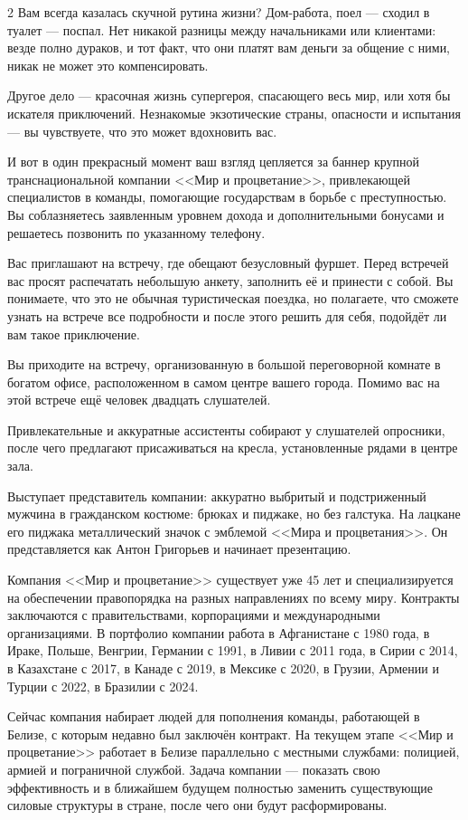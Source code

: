 \documentclass{article}
\begin{document}
\begin{multicols}{2}
Вам всегда казалась скучной рутина жизни? Дом-работа, поел --- сходил в туалет --- поспал. Нет никакой разницы между начальниками или клиентами: везде полно дураков, и тот факт, что они платят вам деньги за общение с ними, никак не может это компенсировать.

Другое дело --- красочная жизнь супергероя, спасающего весь мир, или хотя бы искателя приключений. Незнакомые экзотические страны, опасности и испытания --- вы чувствуете, что это может вдохновить вас.

И вот в один прекрасный момент ваш взгляд цепляется за баннер крупной транснациональной компании <<Мир и процветание>>, привлекающей специалистов в команды, помогающие государствам в борьбе с преступностью. Вы соблазняетесь заявленным уровнем дохода и дополнительными бонусами и решаетесь позвонить по указанному телефону.

Вас приглашают на встречу, где обещают безусловный фуршет. Перед встречей вас просят распечатать небольшую анкету, заполнить её и принести с собой. Вы понимаете, что это не обычная туристическая поездка, но полагаете, что сможете узнать на встрече все подробности и после этого решить для себя, подойдёт ли вам такое приключение.

Вы приходите на встречу, организованную в большой переговорной комнате в богатом офисе, расположенном в самом центре вашего города. Помимо вас на этой встрече ещё человек двадцать слушателей.

Привлекательные и аккуратные ассистенты собирают у слушателей опросники, после чего предлагают присаживаться на кресла, установленные рядами в центре зала.

Выступает представитель компании: аккуратно выбритый и подстриженный мужчина в гражданском костюме: брюках и пиджаке, но без галстука. На лацкане его пиджака металлический значок с эмблемой <<Мира и процветания>>. Он представляется как Антон Григорьев и начинает презентацию.

Компания <<Мир и процветание>> существует уже 45 лет и специализируется на обеспечении правопорядка на разных направлениях по всему миру. Контракты заключаются с правительствами, корпорациями и международными организациями. В портфолио компании работа в Афганистане с 1980 года, в Ираке, Польше, Венгрии, Германии с 1991, в Ливии с 2011 года, в Сирии с 2014, в Казахстане с 2017, в Канаде с 2019, в Мексике с 2020, в Грузии, Армении и Турции с 2022, в Бразилии с 2024.

Сейчас компания набирает людей для пополнения команды, работающей в Белизе, с которым недавно был заключён контракт. На текущем этапе <<Мир и процветание>> работает в Белизе параллельно с местными службами: полицией, армией и пограничной службой. Задача компании --- показать свою эффективность и в ближайшем будущем полностью заменить существующие силовые структуры в стране, после чего они будут расформированы.


\end{multicols}
\end{document}
